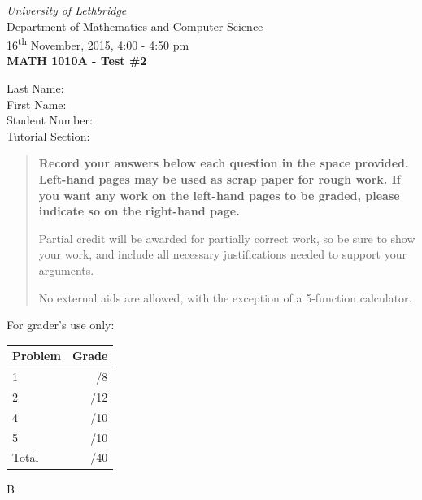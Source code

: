 \documentclass[12pt]{article}
\newcommand{\skipline}{\vspace{12pt}}
\begin{document}
\author{Instructor: Sean Fitzpatrick}
\thispagestyle{plain}
\begin{center}
\emph{University of Lethbridge}\\
Department of Mathematics and Computer Science\\
16\textsuperscript{th} November, 2015, 4:00 - 4:50 pm\\
{\bf MATH 1010A - Test \#2}\\
\end{center}
\skipline \skipline \skipline \noindent \skipline
Last Name:\underline{\hspace{353pt}}\\
\skipline
First Name:\underline{\hspace{350pt}}\\
\skipline
Student Number:\underline{\hspace{323pt}}\\
\skipline
Tutorial Section: \underline{\hspace{320pt}}\\


\vspace{0.5in}


\begin{quote}
 {\bf Record your answers below each question in the space provided.    Left-hand pages may be used as scrap paper for rough work.  If you want any work on the left-hand pages to be graded, please indicate so on the right-hand page.
 
 \bigskip
 
Partial credit will be awarded for partially correct work, so be sure to show your work, and include all necessary justifications needed to support your arguments.

\bigskip

No external aids are allowed, with the exception of a 5-function calculator.}
\end{quote}


\vspace{0.5in}

For grader's use only:

\begin{table}[hbt]
\begin{center}
\begin{tabular}{|l|r|} \hline
Problem &Grade\\
\hline \hline
\cline{1-2} 1 & \enspace\enspace\enspace\enspace\enspace\enspace/8\\
\cline{1-2} 2 & \enspace\enspace\enspace\enspace\enspace\enspace/12\\
\cline{1-2} 4 & \enspace\enspace\enspace\enspace\enspace\enspace/10\\
\cline{1-2} 5 & \enspace\enspace\enspace\enspace\enspace\enspace/10\\
\cline{1-2} Total & \enspace\enspace\enspace\enspace\enspace\enspace/40\\
\hline
\end{tabular}

\skipline

\skipline

\skipline

B
\end{center}
\end{table}
\newpage
\end{document}
